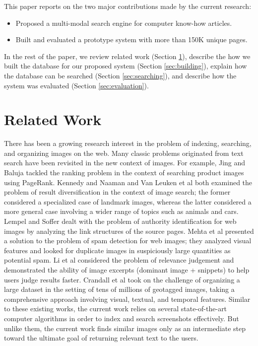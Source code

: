 \documentclass{www2010-submission}
\begin{document}
This paper reports on the two major contributions made by the current research:
\begin{itemize}
\item Proposed a multi-modal search engine for computer know-how articles.
\item Built and evaluated a prototype system with more than 150K unique
pages.
\end{itemize}
In the rest of the paper, we review related work (Section
\ref{sec:related_work}), describe the how we built the database for our
proposed system (Section \ref{sec:building}), explain how the database
can be searched (Section \ref{sec:searching}), and describe how the
system was evaluated (Section \ref{sec:evaluation}).

\section{Related Work}
\label{sec:related_work}

There has been a growing research interest in the problem of indexing,
searching, and organizing images on the web.  Many classic problems
originated from text search have been revisited in the new context of
images. For example, Jing and Baluja \cite{Jing} tackled the ranking
problem in the context of searching product images using PageRank.
Kennedy and Naaman \cite{Kennedy} and Van Leuken et al
\cite{vanLeuken} both examined the problem of result diversification in
the context of image search; the former considered a specialized case
of landmark images, whereas the latter considered a more general case
involving a wider range of topics such as animals and cars. Lempel and
Soffer \cite{Lempel} dealt with the problem of authority
identification for web images by analyzing the link structures of the
source pages.  Mehta et al \cite{Mehta} presented a solution to the
problem of spam detection for web images; they analyzed visual
features and looked for duplicate images in suspiciously large
quantities as potential spam.  Li et al \cite{Li} considered the
problem of relevance judgement and demonstrated the ability of image
excerpts (dominant image + snippets) to help users judge results
faster. Crandall et al \cite{Crandall} took on the challenge of
organizing a large dataset in the setting of tens of millions of
geotagged images, taking a comprehensive approach involving visual,
textual, and temporal features. Similar to these existing works, the
current work relies on several state-of-the-art computer algorithms in
order to index and search screenshots effectively. But unlike them,
the current work finds similar images only as an intermediate step
toward the ultimate goal of returning relevant text to the users.
\end{document}
